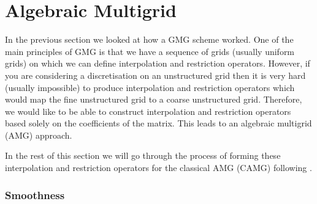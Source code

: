 \documentclass[11pt]{article}
\numberwithin{equation}{section}    %
\begin{document}
\section{Algebraic Multigrid} \label{sec:AMG}

In the previous section we looked at how a GMG scheme worked. One of the main principles of GMG is that we have a sequence of grids (usually uniform grids) on which we can define interpolation and restriction operators. However, if you are considering a discretisation on an unstructured grid then it is very hard (usually impossible) to produce interpolation and restriction operators which would map the fine unstructured grid to a coarse unstructured grid. Therefore, we would like to be able to construct interpolation and restriction operators based solely on the coefficients of the matrix. This leads to an algebraic multigrid (AMG) approach.


In the rest of this section we will go through the process of forming these interpolation and restriction operators for the classical AMG (CAMG) following \cite{brandt1985algebraic,ruge1987algebraic,brandt1986algebraic}.

\subsubsection*{Smoothness}
\end{document}
